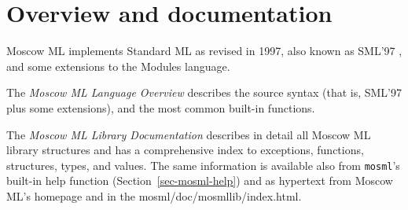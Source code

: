 \documentclass[fleqn]{article}
\begin{document}
%
%
%
%
%
%
%


\section{Overview and documentation}

Moscow ML implements Standard ML as revised in 1997, also known as
SML'97 \cite{Milner:1997:TheDefinition, Milner:1990:TheDefinition},
and some extensions to the Modules language.  

The {\em Moscow ML Language Overview\/}
\cite{MoscowML:2000:MoscowMLLanguage} describes the source syntax
(that is, SML'97 plus some extensions), and the most common built-in
functions.

The \emph{Moscow ML Library Documentation}
\cite{MoscowML:2000:MoscowMLLibrary} describes in detail all Moscow ML
library structures and has a comprehensive index to exceptions,
functions, structures, types, and values.  The same information is
available also from {\tt mosml}'s built-in help function
(Section~\ref{sec-mosml-help}) and as hypertext from Moscow ML's
homepage and in the mosml/doc/mosmllib/index.html.
\end{document}
